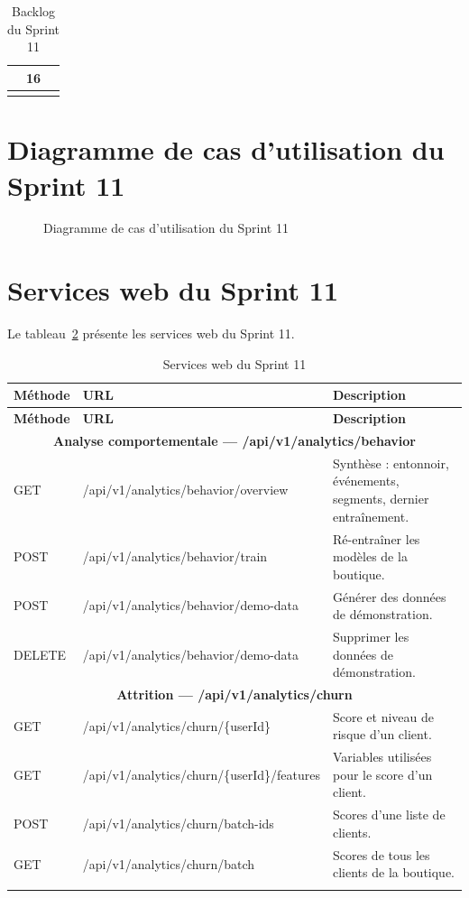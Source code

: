 \begin{longtable}{|>{\raggedright\arraybackslash}p{4cm}|>{\raggedright\arraybackslash}p{9cm}|>{\centering\arraybackslash}p{1.2cm}|}
\multicolumn{2}{|r|}{\textbf{Total}} & \textbf{16} \\
\hline
\caption{Backlog du Sprint 11}
\label{tab:backlog-sprint11}
\end{longtable}

\section{Diagramme de cas d'utilisation du Sprint 11}
\begin{figure}[H]
    \centering
    \caption{Diagramme de cas d'utilisation du Sprint 11}
    \label{fig:cu-sprint11}
\end{figure}

\section{Services web du Sprint 11}
Le tableau~\ref{tab:ws-sprint11} présente les services web du Sprint 11.
\renewcommand{\arraystretch}{1.15}
\setlength{\tabcolsep}{4pt}
\begin{longtable}{|p{1.5cm}|p{6.8cm}|p{6.2cm}|}
\hline
\textbf{Méthode} & \textbf{URL} & \textbf{Description} \\
\hline
\endfirsthead
\hline
\textbf{Méthode} & \textbf{URL} & \textbf{Description} \\
\hline
\endhead
\multicolumn{3}{|c|}{\textbf{Analyse comportementale --- /api/v1/analytics/behavior}} \\
\hline
GET & /api/v1/analytics/behavior/overview & Synthèse : entonnoir, événements, segments, dernier entraînement. \\
\hline
POST & /api/v1/analytics/behavior/train & Ré-entraîner les modèles de la boutique. \\
\hline
POST & /api/v1/analytics/behavior/demo-data & Générer des données de démonstration. \\
\hline
DELETE & /api/v1/analytics/behavior/demo-data & Supprimer les données de démonstration. \\
\hline
\multicolumn{3}{|c|}{\textbf{Attrition --- /api/v1/analytics/churn}} \\
\hline
GET & /api/v1/analytics/churn/\{userId\} & Score et niveau de risque d'un client. \\
\hline
GET & /api/v1/analytics/churn/\{userId\}/features & Variables utilisées pour le score d'un client. \\
\hline
POST & /api/v1/analytics/churn/batch-ids & Scores d'une liste de clients. \\
\hline
GET & /api/v1/analytics/churn/batch & Scores de tous les clients de la boutique. \\
\hline
\caption{Services web du Sprint 11}
\label{tab:ws-sprint11}
\end{longtable}

